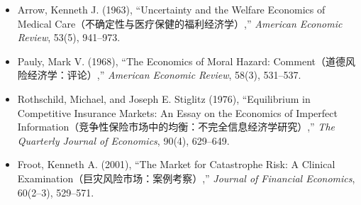 \begin{itemize}

\item Arrow, Kenneth J. (1963),
``Uncertainty and the Welfare Economics of Medical Care（不确定性与医疗保健的福利经济学）,''
\emph{American Economic Review}, 53(5), 941--973.

\item Pauly, Mark V. (1968),
``The Economics of Moral Hazard: Comment（道德风险经济学：评论）,''
\emph{American Economic Review}, 58(3), 531--537.

\item Rothschild, Michael, and Joseph E. Stiglitz (1976),
``Equilibrium in Competitive Insurance Markets: An Essay on the Economics of Imperfect Information（竞争性保险市场中的均衡：不完全信息经济学研究）,''
\emph{The Quarterly Journal of Economics}, 90(4), 629--649.

\item Froot, Kenneth A. (2001),
``The Market for Catastrophe Risk: A Clinical Examination（巨灾风险市场：案例考察）,''
\emph{Journal of Financial Economics}, 60(2--3), 529--571.

\end{itemize}


